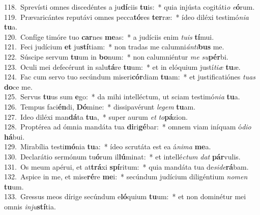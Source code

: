 {118.~}Sprevísti omnes discedéntes a ju\textbf{dí}ciis \textbf{tu}is:~* quia injústa cogitáti\textit{o} \textit{e}\textbf{ó}rum.\\
{119.~}Prævaricántes reputávi omnes pecca\textbf{tó}res \textbf{ter}ræ:~* ídeo diléxi testimó\textit{ni}\textit{a} \textbf{tu}a.\\
{120.~}Confíge timóre tuo \textbf{car}nes \textbf{me}as:~* a judíciis enim \textit{tu}\textit{is} \textbf{tí}mui.\\
{121.~}Feci judícium \textbf{et} ju\textbf{stí}tiam:~* non tradas me calumni\textit{án}\textit{ti}\textbf{bus} me.\\
{122.~}Súscipe servum \textbf{tu}um in \textbf{bo}num:~* non calumniéntur \textit{me} \textit{su}\textbf{pér}bi.\\
{123.~}Oculi mei defecérunt in salu\textbf{tá}re \textbf{tu}um:~* et in elóquium justí\textit{ti}\textit{æ} \textbf{tu}æ.\\
{124.~}Fac cum servo tuo secúndum miseri\textbf{cór}diam \textbf{tu}am:~* et justificatiónes \textit{tu}\textit{as} \textbf{do}ce me.\\
{125.~}Servus \textbf{tu}us sum \textbf{e}go:~* da mihi intelléctum, ut sciam testimó\textit{ni}\textit{a} \textbf{tu}a.\\
{126.~}Tempus faci\textbf{én}di, \textbf{Dó}mine:~* dissipavérunt \textit{le}\textit{gem} \textbf{tu}am.\\
{127.~}Ideo diléxi man\textbf{dá}ta \textbf{tu}a,~* super aurum \textit{et} \textit{to}\textbf{pá}zion.\\
{128.~}Proptérea ad ómnia mandáta tua \textbf{di}ri\textbf{gé}bar:~* omnem viam iníquam ó\textit{di}\textit{o} \textbf{há}bui.\\
{129.~}Mirabília testi\textbf{mó}nia \textbf{tu}a:~* ídeo scrutáta est ea á\textit{ni}\textit{ma} \textbf{me}a.\\
{130.~}Declarátio sermónum tu\textbf{ó}rum il\textbf{lú}minat:~* et intellé\textit{ctum} \textit{dat} \textbf{pár}vulis.\\
{131.~}Os meum apérui, et at\textbf{trá}xi \textbf{spí}ritum:~* quia mandáta tua de\textit{si}\textit{de}\textbf{rá}bam.\\
{132.~}Aspice in me, et mise\textbf{ré}re \textbf{me}i:~* secúndum judícium diligéntium \textit{no}\textit{men} \textbf{tu}um.\\
{133.~}Gressus meos dírige secúndum e\textbf{ló}quium \textbf{tu}um:~* et non dominétur mei omnis \textit{in}\textit{ju}\textbf{stí}tia.\\
